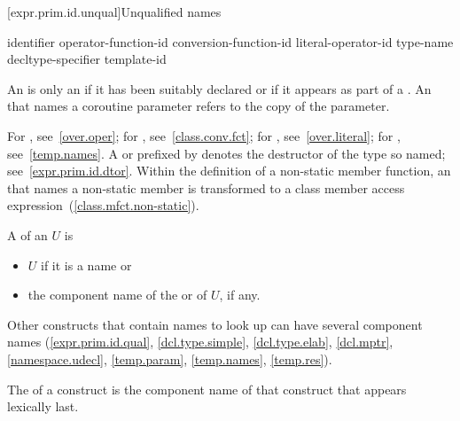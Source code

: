 [expr.prim.id.unqual]{Unqualified names}

\begin{bnf}
\br
    identifier\br
    operator-function-id\br
    conversion-function-id\br
    literal-operator-id\br
    \terminal{\~} type-name\br
    \terminal{\~} decltype-specifier\br
    template-id
\end{bnf}

\pnum
{}%
An  is only
an  if it has
been suitably declared
or if it appears as part of a .
An  that names a coroutine parameter
refers to the copy of the parameter.
\begin{note}
For , see~\ref{over.oper}; for
, see~\ref{class.conv.fct}; for
, see~\ref{over.literal}; for
, see~\ref{temp.names}.
A  or 
prefixed by \tcode{\~} denotes the destructor of the type so named;
see~\ref{expr.prim.id.dtor}.
Within the definition of a non-static member function, an
 that names a non-static member is transformed to a
class member access expression~(\ref{class.mfct.non-static}).
\end{note}

\pnum
A  of an  $U$ is
\begin{itemize}
\item
$U$ if it is a name or
\item
the component name of
the  or  of $U$, if any.
\end{itemize}
\begin{note}
Other constructs that contain names to look up can have several component names
(\ref{expr.prim.id.qual}, \ref{dcl.type.simple}, \ref{dcl.type.elab},
\ref{dcl.mptr}, \ref{namespace.udecl}, \ref{temp.param}, \ref{temp.names},
\ref{temp.res}).
\end{note}
The  of a construct is
the component name of that construct that appears lexically last.

